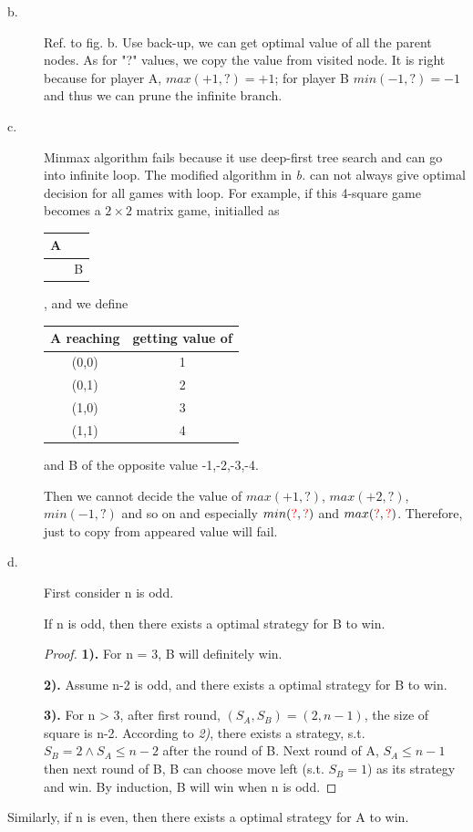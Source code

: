 \documentclass{mcmthesis}
\begin{document}
\begin{description}
	\item[b.] Ref. to fig. b. Use back-up, we can get optimal value of all the parent nodes. As for "?" values, we copy the value from visited node. It is right because for player A, $max(+1,?) = +1$; for player B $min(-1,?)=-1$ and thus we can prune the infinite branch. 
	\item[c.] Minmax algorithm fails because it use deep-first tree search and can go into infinite loop. The modified algorithm in \textit{b.} can not always give optimal decision for all games with loop. For example, if this 4-square game becomes a $2 \times 2$ matrix game, initialled as \begin{tabular}{|c|c|}
		\hline 
		A &  \\ 
		\hline 
		& B \\ 
		\hline 
	\end{tabular} , and we define
	\begin{center}
		

	\begin{tabular}{cc}
		\toprule
		A reaching & getting value of  \\ \midrule
		(0,0) & 1\\ 
		(0,1) & 2\\
		(1,0) & 3\\ 
		(1,1) & 4 \\ \bottomrule 
	\end{tabular}
	\end{center}
	 and B of the opposite value -1,-2,-3,-4. 
	 
	 Then we cannot decide the value of $max(+1,?)$, $max(+2,?)$, $min(-1,?)$ and so on and especially $min({\color{red}?},{\color{red}?})$ and $max({\color{red}?},{\color{red}?})$. Therefore, just to copy from appeared value will fail. 
	\item[d.] First consider n is odd. \begin{Proposition}
		If n is odd, then there exists a optimal strategy for B to win. 
	\end{Proposition}
	
	\begin{proof}
		
		\textbf{1).} For  n = 3, B will definitely win.
		
		\textbf{2).} Assume n-2 is odd, and there exists a optimal strategy for B to win.
		
		\textbf{3).} For n > 3, after first round, $(S_A,S_B)=(2,n-1)$, the size of square is n-2.
		According to \textit{2)}, there exists a strategy, s.t. $S_B=2 \wedge S_A\le n-2$ after the round of B. Next round of A, $S_A\le n-1$ then next round of B, B can choose move left (s.t. $S_B=1$) as its strategy and win. By induction, B will win when n is odd.
	\end{proof}
	
\end{description}
Similarly, if n is even, then there exists a optimal strategy for A to win. 
\end{document}
